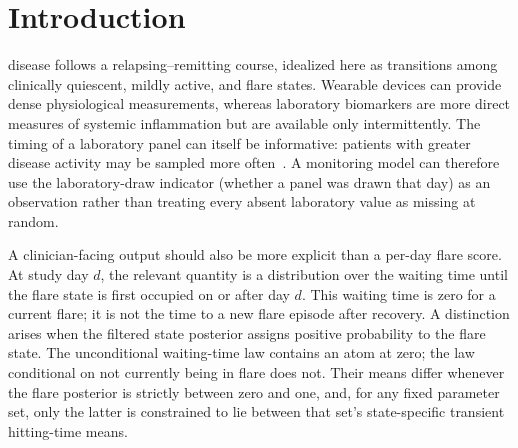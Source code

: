 \documentclass{ieeeaccess}
\begin{document}
\maketitle

\section{Introduction}
 disease follows a relapsing--remitting course, idealized here as transitions among clinically quiescent, mildly active, and flare states. Wearable devices can provide dense physiological measurements, whereas laboratory biomarkers are more direct measures of systemic inflammation but are available only intermittently. The timing of a laboratory panel can itself be informative: patients with greater disease activity may be sampled more often~\cite{lange2015}. A monitoring model can therefore use the laboratory-draw indicator (whether a panel was drawn that day) as an observation rather than treating every absent laboratory value as missing at random.

A clinician-facing output should also be more explicit than a per-day flare score. At study day $d$, the relevant quantity is a distribution over the waiting time until the flare state is first occupied on or after day $d$. This waiting time is zero for a current flare; it is not the time to a new flare episode after recovery. A distinction arises when the filtered state posterior assigns positive probability to the flare state. The unconditional waiting-time law contains an atom at zero; the law conditional on not currently being in flare does not. Their means differ whenever the flare posterior is strictly between zero and one, and, for any fixed parameter set, only the latter is constrained to lie between that set's state-specific transient hitting-time means.
\end{document}
